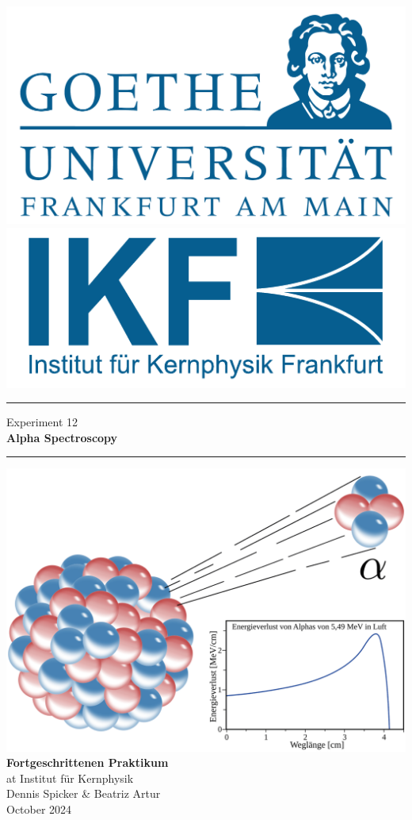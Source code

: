 \documentclass{scrartcl}
\begin{document}
	
\begin{titlepage}
	\newcommand{\HRule}{\rule{\textwidth}{0.5mm}}
	\begin{center}
		{\includegraphics[width=0.3\linewidth]{img/GU-Logo-blau-CMYK} \hfill
			\includegraphics[width=0.3\linewidth]{img/IKF_Logo} \\ }
		\vspace{1cm}
		\HRule
		\vspace{0.4cm}
		{\huge Experiment 12} \\
		\vspace{0.5cm}
		{\huge {\bfseries Alpha Spectroscopy}} \\
		\vspace{0.2cm}
		\HRule
		\vfill
		\includegraphics[width=14cm]{img/front_cover.png}
		\vfill
		{\Large\bfseries Fortgeschrittenen Praktikum} \\
		\vspace{0.3cm}
		{\Large at Institut für Kernphysik} \\
		\vspace{1.5cm}
		{\small 
			Dennis Spicker \& Beatriz Artur \\
			October 2024
		}
	\end{center} 
	\thispagestyle{empty}
	\clearpage
\end{titlepage}
%
\setcounter{tocdepth}{2}
\tableofcontents
\clearpage
\end{document}
